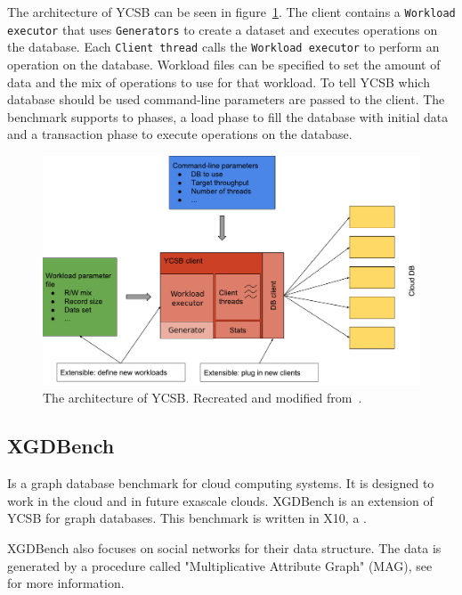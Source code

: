 The architecture of YCSB can be seen in figure~\ref{fig:ycsbArchitecture}.
The client contains a \texttt{Workload executor} that uses \texttt{Generators} to create a dataset and executes operations on the database.
Each \texttt{Client thread} calls the \texttt{Workload executor} to perform an operation on the database.
Workload files can be specified to set the amount of data and the mix of operations to use for that workload.
To tell YCSB which database should be used command-line parameters are passed to the client.
The benchmark supports to phases,
a load phase to fill the database with initial data and a transaction phase to execute operations on the database.

\begin{figure}[h!]
  \centering
  \includegraphics[width=\textwidth]{images/benchmarks/ycsbArchitecture}
  \caption{The architecture of YCSB. Recreated and modified from~\cite[25]{Abubakar2014}.}
  \label{fig:ycsbArchitecture}
\end{figure}

\subsection{XGDBench}
\label{ch:background:se:XGDBench}
Is a graph database benchmark for cloud computing systems.
It is designed to work in the cloud and in future exascale clouds.
XGDBench is an extension of YCSB for graph databases.
This benchmark is written in X10,
a .

XGDBench also focuses on social networks for their data structure.
The data is generated by a procedure called "Multiplicative Attribute Graph" (MAG),
see~\cite{Kim2012} for more information.

